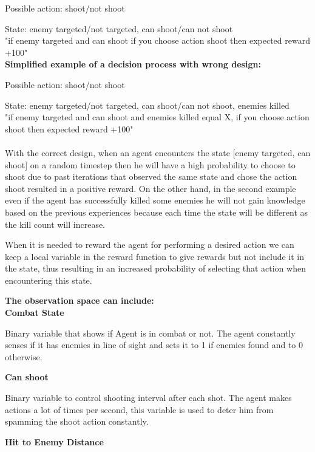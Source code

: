 \documentclass[a4paper,one side,12pt]{book}
\begin{document}
Possible action: shoot/not shoot

State: enemy targeted/not targeted, can shoot/can not shoot\\

"if enemy targeted and can shoot if you choose action shoot then expected reward +100"\\

\textbf{Simplified example of a decision process with wrong design:}

Possible action: shoot/not shoot

State: enemy targeted/not targeted, can shoot/can not shoot, enemies killed\\

"if enemy targeted and can shoot and enemies killed equal X, if you choose action shoot then expected reward +100"\\\\

With the correct design, when an agent encounters the state [enemy targeted, can shoot] on a random timestep then he 
will have a high probability to choose to shoot due to past iterations that observed the same state and chose the action shoot resulted in 
a positive reward. On the other hand, in the second example even if the agent has successfully killed
some enemies he will not gain knowledge based on the previous experiences because each time the state will be different as the kill count will increase.

When it is needed to reward the agent for performing a desired action we can keep a local variable in the reward function to 
give rewards but not include it in the state, thus resulting in an increased probability of selecting that action when encountering this state.


\textbf{The observation space can include:}\\

\textbf{Combat State}

Binary variable that shows if Agent is in combat or not. The agent
constantly senses if it has enemies in line of sight and sets it to 1 if
enemies found and to 0 otherwise.

\textbf{Can shoot}

Binary variable to control shooting interval after each shot. The agent
makes actions a lot of times per second, this variable is used to deter
him from spamming the shoot action constantly.

\textbf{Hit to Enemy Distance}
\end{document}
